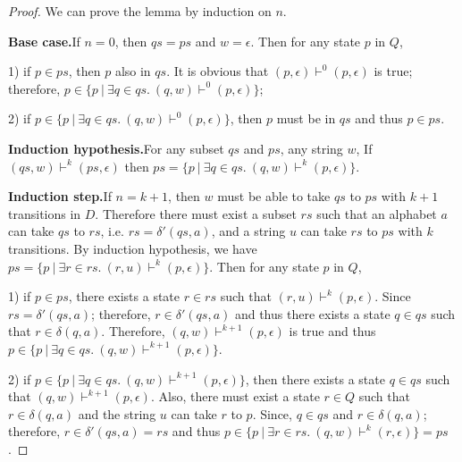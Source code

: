 \begin{proof}
\noindent We can prove the lemma by induction on \(n\). 

\par \noindent \textbf{Base case.}\quad If \(n = 0\), then \(qs = ps\)
and \(w = \epsilon\). Then for any state \(p\) in \(Q\), 
\par 1) if \(p \in ps\), then \(p\) also in \(qs\). It is obvious that
\((p,\epsilon) \vdash^0 (p, \epsilon)\) is true; therefore, \(p \in
\{p\ |\ \exists q\in qs.\ (q,w) \vdash^0 (p,\epsilon)\}\); 
\par 2) if \(p \in \{p\ |\ \exists q\in qs.\ (q,w) \vdash^0
(p,\epsilon)\}\), then \(p\) must be in \(qs\) and thus \(p \in ps\). 

\par \noindent \textbf{Induction hypothesis.}\quad For any subset
\(qs\) and \(ps\), any string \(w\), If \((qs,w) \vdash^k (ps,\epsilon)\) then \(ps =
\{p\ |\ \exists q\in qs.\ (q,w) \vdash^k (p,\epsilon)\}\).  

\par \noindent \textbf{Induction step.}\quad If \(n = k + 1\), then
\(w\) must be able to take \(qs\) to \(ps\) with \(k + 1\)
transitions in \(D\). Therefore there must exist a subset \(rs\) such
that an alphabet \(a\) can take \(qs\) to \(rs\),
i.e. \(rs = \delta'(qs,a)\), and a string \(u\) can take \(rs\) to
\(ps\) with \(k\) transitions. By induction hypothesis, we have \(ps =
\{p\ |\ \exists r\in rs.\ (r,u) \vdash^k (p,\epsilon)\}\). Then for any state \(p\) in \(Q\), 

\par 1) if \(p \in ps\), there exists a state \(r \in rs\)
such that \((r,u) \vdash^k (p,\epsilon)\). Since \(rs =
\delta'(qs,a)\); therefore, \(r \in \delta'(qs,a)\) and thus there
exists a state \(q \in qs\) such that \(r \in \delta (q,a)\). Therefore,
\((q,w) \vdash^{k+1} (p,\epsilon)\) is true and thus \(p \in \{p\ |\ \exists q\in qs.\ (q,w) \vdash^{k+1}
(p,\epsilon)\}\). 

\par 2) if \(p \in \{p\ |\ \exists q\in qs.\ (q,w) \vdash^{k+1}
(p,\epsilon)\}\), then there exists a state \(q \in qs\) such that \((q,w) \vdash^{k+1}
(p,\epsilon)\). Also, there must exist a state \(r \in Q\) such that
\(r \in \delta (q,a)\) and the string \(u\) can take \(r\) to \(p\). Since, \(q
\in qs\) and \(r \in \delta (q,a)\); therefore, \(r \in \delta'(qs,a)
= rs\) and thus \(p \in \{p\ |\ \exists r\in rs.\ (q,w) \vdash^k
(r,\epsilon)\} = ps\). 
\end{proof}

